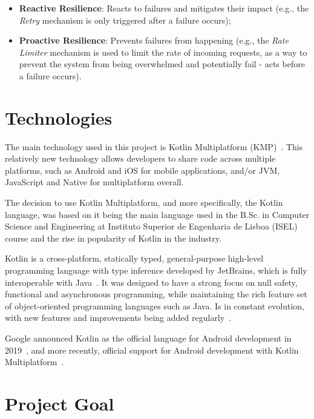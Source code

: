 \begin{itemize}
    \item \textbf{Reactive Resilience}: Reacts to failures and mitigates their impact (e.g., the \textit{Retry} mechanism is only triggered after a failure occurs);
    \item \textbf{Proactive Resilience}: Prevents failures from happening (e.g., the \textit{Rate Limiter} mechanism is used to limit the rate of incoming requests, as a way to prevent the system from being overwhelmed and potentially fail - acts before a failure occurs).
\end{itemize}


\section{Technologies}\label{sec:technologies}

The main technology used in this project is Kotlin Multiplatform (KMP)~\cite{kotlin-multiplatform}.
This relatively new technology allows developers to share code across multiple platforms, such as Android and iOS for mobile applications, and/or JVM, JavaScript and Native for multiplatform overall.

The decision to use Kotlin Multiplatform, and more specifically, the Kotlin language, was based on it being the main language used in the B.Sc. in Computer Science and Engineering at Instituto Superior de Engenharia de Lisboa (ISEL) course and the rise in popularity of Kotlin in the industry.

Kotlin is a cross-platform, statically typed, general-purpose high-level programming language with type inference developed by JetBrains, which is fully interoperable with Java~\cite{wiki:kotlin-programming-language}.
It was designed to have a strong focus on null safety, functional and asynchronous programming, while maintaining the rich feature set of object-oriented programming languages such as Java.
Is in constant evolution, with new features and improvements being added regularly~\cite{kotlin-keep}.

Google announced Kotlin as the official language for Android development in 2019~\cite{wiki:kotlin-programming-language}, and more recently, official support for Android development with Kotlin Multiplatform~\cite{android-kotlin-multiplatform, google-kotlin-multiplatform}.


\section{Project Goal}\label{sec:project-goal}

